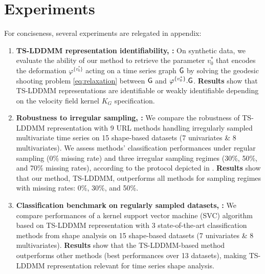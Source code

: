 \section{Experiments}
\vspace{-1ex}
\label{section:experiments}

For conciseness, several experiments are relegated in appendix: 

\begin{enumerate}
    \item \textbf{TS-LDDMM representation identifiability, :} On synthetic data, we evaluate the ability of our method to retrieve the parameter $v_0^*$ that encodes the deformation $\varphi^{\{v_0^*\}}$ acting on a time series graph $\mathsf{G}$ by solving the geodesic shooting problem \eqref{eq:relaxation} between $\mathsf{G}$ and $\varphi^{\{v_0^*\}}.\mathsf{G}$.
     \textbf{Results} show that TS-LDDMM representations are identifiable or weakly identifiable depending on the velocity field kernel $K_G$ specification.
  
    \item \textbf{Robustness to irregular sampling, :} We compare the robustness of TS-LDDMM representation with 9 URL methods handling irregularly sampled multivariate time series on 15 shape-based datasets (7 univariates \& 8 multivariates).
     We assess methods' classification performances under regular sampling (0\% missing rate) and three irregular sampling regimes (30\%, 50\%, and 70\% missing rates), according to the protocol depicted in \cite{kidger2020neural}.
      \textbf{Results} show that our method, TS-LDDMM, outperforms all methods for sampling regimes with missing rates: 0\%, 30\%, and 50\%.
    
    \item \textbf{Classification benchmark on regularly sampled datasets, :} We compare performances of a kernel support vector machine (SVC) algorithm based on TS-LDDMM representation with 3 state-of-the-art classification methods from shape analysis on 15 shape-based datasets (7 univariates \& 8 multivariates). \textbf{Results} show that the TS-LDDMM-based method outperforms other methods (best performances over 13 datasets), making TS-LDDMM representation relevant for time series shape analysis.
\end{enumerate}
